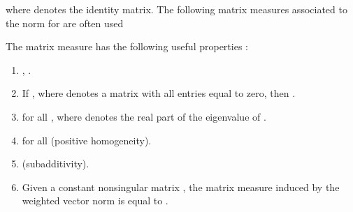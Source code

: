 \documentclass[twocolumn]{autart}
\begin{document}
where  denotes the identity matrix.
The following matrix measures associated to the norm for  are often used

The matrix measure  has the following useful properties \citep{vidyasagar2002nonlinear,desoer1972measure}:
\begin{enumerate}
\item
\label{app:mu_prop2}
, .
\item
\label{app:mu_prop3}
If , where  denotes a matrix with all entries equal to zero, then .
\item
\label{app:mu_prop4}
 for all , where  denotes the real part of the eigenvalue  of .
\item
\label{app:mu_prop5}
 for all  (positive homogeneity).
\item
\label{app:mu_prop6}
 (subadditivity).
\item
\label{app:mu_prop7}
Given a constant nonsingular matrix , the matrix measure  induced by the weighted vector norm  is equal to . 
\end{enumerate}
\end{document}
